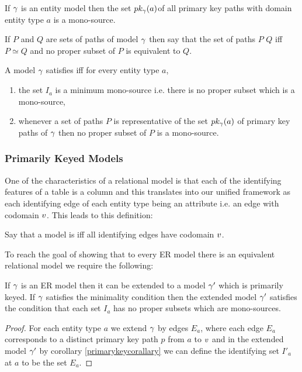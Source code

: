 \begin{corollary}
\label{primarykeycorallary}
If $\gamma$ is an entity model then the set $pk_{\gamma}(a)$of all primary key paths 
with domain entity type $a$ is a mono-source.
\end{corollary}


\begin{definition}
If $P$ and $Q$ are sets of paths of model $\gamma$ then say that the set of paths $P$ 
 $Q$ 
iff $P \simeq Q$ and no proper subset of $P$ is equivalent to $Q$.
\end{definition}


\begin{definition}
A model $\gamma$ satisfies  iff for every entity type $a$,
\begin{enumerate}
\item the set $I_a$ is a minimum mono-source i.e. there is no proper subset which is a mono-source,
\item whenever a set of paths $P$ is representative of the set $pk_{\gamma}(a)$  of primary key paths of $\gamma$ then no proper subset of $P$ is a mono-source.
\end{enumerate}
\end{definition}

\subsubsection{Primarily Keyed Models}

One of the characteristics of a relational model is that each of the identifying features of a table is a column
and this translates into our unified framework as each identifying edge of each entity type being an attribute i.e. 
an edge with codomain $v$. This leads to this definition: 
\begin{definition}
Say that a model is  iff all identifying edges 
have codomain $v$.
\end{definition}
To reach the goal of showing that to every ER model there is an equivalent relational model we require the following:
\begin{lemma}
If $\gamma$ is an ER model then it can be extended to a model $\gamma'$
which is primarily keyed. If $\gamma$ satisfies the minimality condition then the
extended model $\gamma'$ satisfies the  condition that each set $I_a$ has no proper subsets which are mono-sources. 
\end{lemma}
\begin{proof}
For each entity type $a$ we extend $\gamma$ by edges $E_a$, where each edge 
$E_a$ corresponds to a distinct primary key path $p$ from $a$ to $v$
and in the extended model $\gamma'$ by corollary \ref{primarykeycorallary} 
we can define the identifying set $I'_a$ at $a$ to be the set
$E_a$. 
\end{proof}

